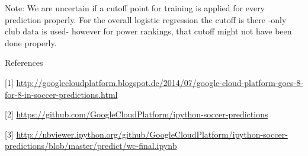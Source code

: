 \documentclass[12pt,fleqn]{article}\usepackage{common}
\begin{document}
Note: We are uncertain if a cutoff point for training is applied for every
prediction properly. For the overall logistic regression the cutoff is
there -only club data is used- however for power rankings, that cutoff
might not have been done properly.

References

[1] \url{http://googlecloudplatform.blogspot.de/2014/07/google-cloud-platform-goes-8-for-8-in-soccer-predictions.html}

[2] \url{https://github.com/GoogleCloudPlatform/ipython-soccer-predictions}

[3] \url{http://nbviewer.ipython.org/github/GoogleCloudPlatform/ipython-soccer-predictions/blob/master/predict/wc-final.ipynb}
\end{document}
